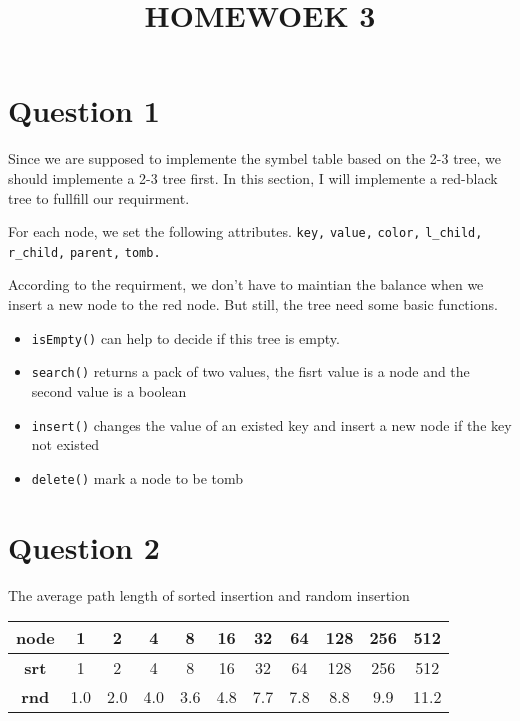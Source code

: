 \documentclass[conference]{IEEEtran}
\begin{document}
\title{HOMEWOEK 3}

\author{
}

\maketitle

\section*{Question 1}

Since we are supposed to implemente the symbel table based on the 2-3 tree, we should 
implemente a 2-3 tree first. In this section, I will implemente a red-black tree to 
fullfill our requirment. 

For each node, we set the following attributes. \verb|key,| \verb|value,| \verb|color,|
\verb|l_child,| \verb|r_child,| \verb|parent,| \verb|tomb.|

According to the requirment, we don't have to maintian the balance when we insert a new 
node to the red node. But still, the tree need some basic functions. 
\begin{itemize}
    \item \verb|isEmpty()| can help to decide if this tree is empty. 
    \item \verb|search()| returns a pack of two values, the fisrt value is a node and the second value is a boolean
    \item \verb|insert()| changes the value of an existed key and insert a new node if the key not existed
    \item \verb|delete()| mark a node to be tomb
\end{itemize}

\section*{Question 2}

The average path length of sorted insertion and random insertion
\begin{table}[H]
    \begin{center}
        \begin{tabular}{|c|c|c|c|c|c|c|c|c|c|c|}
            \hline
            \textbf{node}&1&2&4&8&16&32&64&128&256&512\\
            \hline
            \textbf{srt}&1&2&4&8&16&32&64&128&256&512\\
            \hline
            \textbf{rnd}&1.0&2.0&4.0&3.6&4.8&7.7&7.8&8.8&9.9&11.2\\
            \hline
        \end{tabular}
    \end{center}
\end{table}
\end{document}
